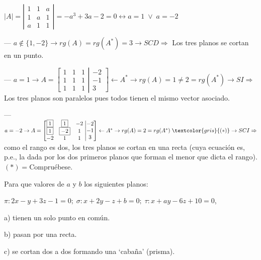 \begin{proofw}\renewcommand{\qedsymbol}{$\diamond$}
	$|A|=\left| \begin{matrix} 1&1&a\\1&a&1\\a&1&1 \end{matrix} \right|=-a^3+3a-2=0 \leftrightarrow a=1 \; \vee \; a=-2$
	
\noindent --- $a\notin \{1,-2\} \to rg(A)=rg(A^*)=3 \to SCD \Rightarrow$ Los tres planos se cortan en un punto.

\noindent --- $a=1\to A=\left[\begin{matrix} 1&1&1\\1&1&1\\1&1&1 \end{matrix} \right. \left| \begin{matrix} -2\\-1\\3 \end{matrix} \right] \leftarrow A^* \to rg(A)=1\neq 2=rg(A^*) \to SI \Rightarrow $ Los tres planos son paralelos pues todos tienen el mismo vector asociado.

\noindent --- $a=-2 \to A=\left[\begin{matrix} \boxed{1}&\boxed{1}&-2\\\boxed{1}&\boxed{-2}&1\\-2&1&1 \end{matrix} \right. \left| \begin{matrix} -2\\-1\\3 \end{matrix} \right] \leftarrow A^* \to rg(A)=2=rg(A^*)\;\textcolor{gris}{ (*)} \to SCI \Rightarrow $ como el rango es dos, los tres planos se cortan en una recta (cuya ecuación es, p.e., la dada por los dos primeros planos que forman el menor que dicta el rango). \textcolor{gris}{$(*)=$Compruébese}.

\end{proofw}

\begin{ejre}
Para que valores de $a$ y $b$ los siguientes planos:

$\pi:2x-y+3z-1=0;\; \sigma: x+2y-z+b=0; \; \tau: x+ay-6z+10=0$,

a) tienen un solo punto en común.

b) pasan por una recta.

c) se cortan dos a dos formando una `cabaña' (prisma).	
\end{ejre}

